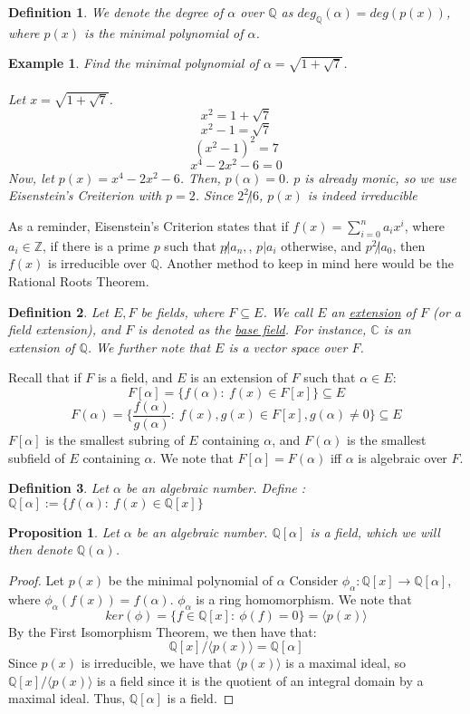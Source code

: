 \documentclass{article}
\newcommand{\C}{\mathbb{C}}
\newcommand{\Q}{\mathbb{Q}}
\newcommand{\Z}{\mathbb{Z}}
\newtheorem{example}{Example}
\newtheorem{proposition}{Proposition}
\newtheorem{definition}{Definition}
\begin{document}
\begin{definition}
We denote the degree of $\alpha$ over $\Q$ as $deg_\Q(\alpha)=deg(p(x))$, where $p(x)$ is the minimal polynomial of $\alpha$.
\end{definition}
\begin{example}
Find the minimal polynomial of $\alpha=\sqrt{1+\sqrt{7}}$.\\
\\
Let $x=\sqrt{1+\sqrt{7}}$.
$$x^2=1+\sqrt{7}$$
$$x^2-1 = \sqrt{7}$$
$$(x^2-1)^2=7$$
$$x^4-2x^2-6=0$$
Now, let $p(x)=x^4-2x^2-6$. Then, $p(\alpha)=0$. $p$ is already monic, so we use Eisenstein's Creiterion with $p=2$. Since $2^2\not| 6$, $p(x)$ is indeed irreducible
\end{example}
\noindent As a reminder, Eisenstein's Criterion states that if $f(x)=\displaystyle\sum_{i=0}^n a_ix^i$, where $a_i\in\Z$, if there is a prime $p$ such that $p\not | a_n,$, $p|a_i$ otherwise, and $p^2\not| a_0$, then $f(x)$ is irreducible over $\Q$. Another method to keep in mind here would be the Rational Roots Theorem.
\begin{definition}
Let $E,F$ be fields, where $F\subseteq E$. We call $E$ an \underline{extension} of $F$ (or a field extension), and $F$ is denoted as the \underline{base field}. For instance, $\C$ is an extension of $\Q$. We further note that $E$ is a vector space over $F$.
\end{definition}
\noindent Recall that if $F$ is a field, and $E$ is an extension of $F$ such that $\alpha\in E$:
$$F[\alpha]=\{f(\alpha):\ f(x)\in F[x]\}\subseteq E$$
$$F(\alpha)=\{\frac{f(\alpha)}{g(\alpha)}:\ f(x),g(x)\in F[x], g(\alpha)\neq 0\}\subseteq E$$
\noindent $F[\alpha]$ is the smallest subring of $E$ containing $\alpha$, and $F(\alpha)$ is the smallest subfield of $E$ containing $\alpha$. We note that $F[\alpha]=F(\alpha)$ iff $\alpha$ is algebraic over $F$.
\begin{definition}
Let $\alpha$ be an algebraic number. Define :
$\Q[\alpha]:=\{f(\alpha):\ f(x)\in\Q[x]\}$
\end{definition}
\begin{proposition}
Let $\alpha$ be an algebraic number. $\Q[\alpha]$ is a field, which we will then denote $\Q(\alpha)$.
\end{proposition}
\begin{proof}
Let $p(x)$ be the minimal polynomial of $\alpha$ Consider $\phi_\alpha: \Q[x]\rightarrow \Q[\alpha]$, where $\phi_\alpha(f(x))=f(\alpha)$. $\phi_\alpha$ is a ring homomorphism. We note that $$ker(\phi)=\{f\in\Q[x]:\ \phi(f)=0\}=\langle p(x)\rangle$$
By the First Isomorphism Theorem, we then have that:
$$\Q[x]/\langle p(x)\rangle = \Q[\alpha]$$
Since $p(x)$ is irreducible, we have that $\langle p(x)\rangle$ is a maximal ideal, so $\Q[x]/\langle p(x)\rangle$ is a field since it is the quotient of an integral domain by a maximal ideal. Thus, $\Q[\alpha]$ is a field.
\end{proof}
\end{document}
